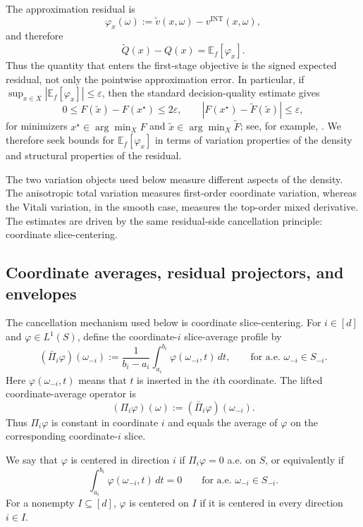 \documentclass[11pt,letterpaper]{article}
\theoremstyle{definition}
\theoremstyle{remark}
\newcommand{\INT}{\mathrm{INT}}
\begin{document}
The approximation residual is
\begin{equation}
\label{eq:residual_definition_section}
\varphi_x(\omega):=\widetilde v(x,\omega)-v^{\INT}(x,\omega),
\end{equation}
and therefore
\begin{equation}
\label{eq:expected_residual_identity_section}
\widetilde Q(x)-Q(x)=\mathbb E_f[\varphi_x].
\end{equation}
Thus the quantity that enters the first-stage objective is the signed expected
residual, not only the pointwise approximation error. In particular, if
$\sup_{x\in X}|\mathbb E_f[\varphi_x]|\le\varepsilon$, then the standard
decision-quality estimate gives
$$
0\le F(\widetilde x)-F(x^\star)\le 2\varepsilon,
\qquad
|F(x^\star)-\widetilde F(\widetilde x)|\le \varepsilon,
$$
for minimizers $x^\star\in\arg\min_X F$ and
$\widetilde x\in\arg\min_X\widetilde F$; see, for example,
\cite{ward2015,wardthesis}. We therefore seek bounds for
$\mathbb E_f[\varphi_x]$ in terms of variation properties of the density and
structural properties of the residual.

The two variation objects used below measure different aspects of the density.
The anisotropic total variation measures first-order coordinate variation,
whereas the Vitali variation, in the smooth case, measures the top-order mixed
derivative. The estimates are driven by the same residual-side cancellation
principle: coordinate slice-centering.

\subsection{Coordinate averages, residual projectors, and envelopes } 
\label{subsec:coordinate_projectors}

The cancellation mechanism used below is coordinate slice-centering. For
$i\in[d]$ and $\varphi\in L^1(S)$, define the coordinate-$i$ slice-average
profile by
$$
(\bar\Pi_i\varphi)(\omega_{-i})
:=
\frac{1}{b_i-a_i}
\int_{a_i}^{b_i}\varphi(\omega_{-i},t)\,dt,
\qquad
\text{for a.e. }\omega_{-i}\in S_{-i}.
$$
Here $\varphi(\omega_{-i},t)$ means that $t$ is inserted in the $i$th
coordinate. The lifted coordinate-average operator is
$$
(\Pi_i\varphi)(\omega):=(\bar\Pi_i\varphi)(\omega_{-i}).
$$
Thus $\Pi_i\varphi$ is constant in coordinate $i$ and equals the average of
$\varphi$ on the corresponding coordinate-$i$ slice.

We say that $\varphi$ is centered in direction $i$ if $\Pi_i\varphi=0$ a.e. on
$S$, or equivalently if
$$
\int_{a_i}^{b_i}\varphi(\omega_{-i},t)\,dt=0
\qquad
\text{for a.e. }\omega_{-i}\in S_{-i}.
$$
For a nonempty $I\subseteq[d]$, $\varphi$ is centered on $I$ if it is centered
in every direction $i\in I$.
\end{document}
